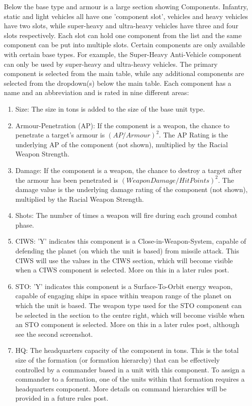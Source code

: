 \documentclass[../../../Aurora C# unofficial manual.tex]{subfiles}
\begin{document}
	Below the base type and armour is a large section showing Components. Infantry, static and light vehicles all have one 'component slot', vehicles and heavy vehicles have two slots, while super-heavy and ultra-heavy vehicles have three and four slots respectively. Each slot can hold one component from the list and the same component can be put into multiple slots. Certain components are only available with certain base types. For example, the Super-Heavy Anti-Vehicle component can only be used by super-heavy and ultra-heavy vehicles. The primary component is selected from the main table, while any additional components are selected from the dropdown(s) below the main table. Each component has a name and an abbreviation and is rated in nine different areas:
	\begin{enumerate}
		\item Size: The size in tons is added to the size of the base unit type.
		\item Armour-Penetration (AP): If the component is a weapon, the chance to penetrate a target's armour is \( (AP / Armour)^{2} \). The AP Rating is the underlying AP of the component (not shown), multiplied by the Racial Weapon Strength.
		\item Damage:  If the component is a weapon, the chance to destroy a target after the armour has been penetrated is \( (Weapon Damage / Hit Points)^{2} \). The damage value is the underlying damage rating of the component (not shown), multiplied by the Racial Weapon Strength.
		\item Shots: The number of times a weapon will fire during each ground combat phase.
		\item CIWS: 'Y' indicates this component is a Close-in-Weapon-System, capable of defending the planet (on which the unit is based) from missile attack. This CIWS will use the values in the CIWS section, which will become visible when a CIWS component is selected. More on this in a later rules post.
		\item STO: 'Y' indicates this component is a Surface-To-Orbit energy weapon, capable of engaging ships in space within weapon range of the planet on which the unit is based. The weapon type used for the STO component can be selected in the section to the centre right, which will become visible when an STO component is selected. More on this in a later rules post, although see the second screenshot.
		\item HQ: The headquarters capacity of the component in tons. This is the total size of the formation (or formation hierarchy) that can be effectively controlled by a commander based in a unit with this component. To assign a commander to a formation, one of the units within that formation requires a headquarters component. More details on command hierarchies will be provided in a future rules post.

\end{enumerate}
\end{document}
